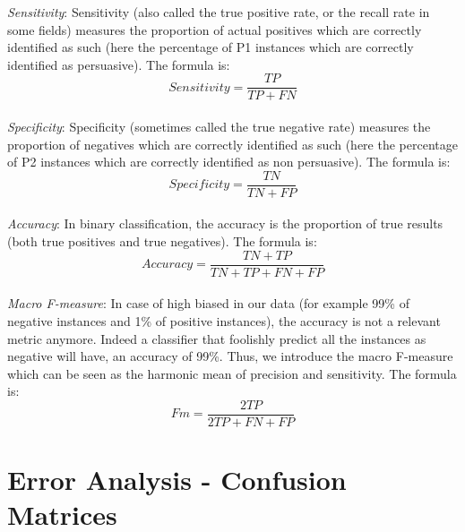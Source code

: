 \textit{Sensitivity}: Sensitivity (also called the true positive rate, or the recall rate in some fields) measures the proportion of actual positives which are correctly identified as such (here the percentage of P1 instances which are correctly identified as persuasive). The formula is:
\begin{equation*}
Sensitivity = \frac{TP}{TP + FN}
\end{equation*}
\\

\textit{Specificity}:  Specificity (sometimes called the true negative rate) measures the proportion of negatives which are correctly identified as such (here the percentage of P2 instances which are correctly identified as non persuasive). The formula is:
\begin{equation*}
Specificity = \frac{TN}{TN + FP}
\end{equation*}
\\

\textit{Accuracy}: In binary classification, the accuracy is the proportion of true results (both true positives and true negatives). The formula is:
\begin{equation*}
Accuracy = \frac{TN + TP}{TN + TP + FN + FP}
\end{equation*}
\\

\textit{Macro F-measure}: In case of high biased in our data (for example 99\% of negative instances and 1\% of positive instances), the accuracy is not a relevant metric anymore. Indeed a classifier that foolishly predict all the instances as negative will have, an accuracy of 99\%. Thus, we introduce the macro F-measure which can be seen as the harmonic mean of precision and sensitivity. The formula is:
\begin{equation*}
Fm = \frac{2 TP}{2 TP + FN + FP}
\end{equation*}

\chapter{Error Analysis - Confusion Matrices}
\label{sec:errana}